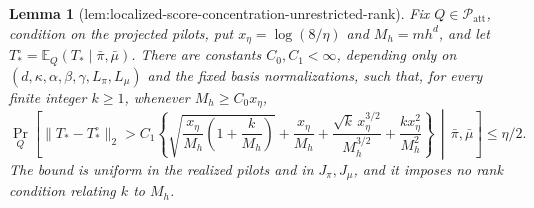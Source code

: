 \documentclass{article}
\newtheorem{lemma}{Lemma}
\begin{document}
\begin{lemma}[lem:localized-score-concentration-unrestricted-rank]\label{lem:localized-score-concentration-unrestricted-rank}
Fix \(Q\in\mathcal P_{\mathrm{att}}\), condition on the projected pilots, put \(x_\eta=\log(8/\eta)\) and \(M_h=mh^d\), and let \(T_*^\circ=\mathbb E_Q(T_*\mid\bar\pi,\bar\mu)\).  There are constants \(C_0,C_1<\infty\), depending only on \((d,\kappa,\alpha,\beta,\gamma,L_\pi,L_\mu)\) and the fixed basis normalizations, such that, for every finite integer \(k\ge1\), whenever \(M_h\ge C_0x_\eta\),
\[
 \Pr_Q\!\left[
 \lVert T_*-T_*^\circ\rVert_2>C_1\left\{
 \sqrt{\frac{x_\eta}{M_h}\left(1+\frac{k}{M_h}\right)}
 +\frac{x_\eta}{M_h}
 +\frac{\sqrt{k}\,x_\eta^{3/2}}{M_h^{3/2}}
 +\frac{kx_\eta^2}{M_h^2}
 \right\}\,\middle|\,\bar\pi,\bar\mu\right]
 \le\eta/2.
\]
The bound is uniform in the realized pilots and in \(J_\pi,J_\mu\), and it imposes no rank condition relating \(k\) to \(M_h\).
\end{lemma}
\end{document}
